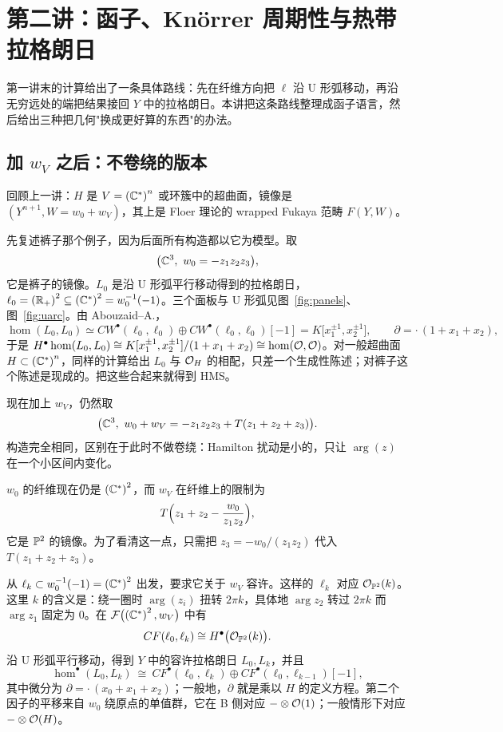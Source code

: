 \section{第二讲：函子、Knörrer 周期性与热带拉格朗日}

第一讲末的计算给出了一条具体路线：先在纤维方向把 $\ell$ 沿 U 形弧移动，再沿无穷远处的端把结果接回 $Y$ 中的拉格朗日。本讲把这条路线整理成函子语言，然后给出三种把几何"换成更好算的东西"的办法。

\subsection{\texorpdfstring{加 $w_V$ 之后：不卷绕的版本}{加 w\_V 之后：不卷绕的版本}}

回顾上一讲：$H$ 是 $V=\left(\mathbb{C}^*\right)^n$ 或环簇中的超曲面，镜像是 $(Y^{n+1},W=w_0+w_V)$，其上是 Floer 理论的 wrapped Fukaya 范畴 $F(Y,W)$。

先复述裤子那个例子，因为后面所有构造都以它为模型。取
\[
\bigl(\mathbb{C}^3,\ w_0=-z_1z_2z_3\bigr),
\]
它是裤子的镜像。$L_0$ 是沿 U 形弧平行移动得到的拉格朗日，$\ell_0=\left(\mathbb{R}_+\right)^2\subseteq\left(\mathbb{C}^*\right)^2=w_0^{-1}(-1)$。三个面板与 U 形弧见图~\ref{fig:panels}、图~\ref{fig:uarc}。由 Abouzaid--A.，
\[
\hom(L_0,L_0)\simeq CW^\bullet(\ell_0,\ell_0)\oplus CW^\bullet(\ell_0,\ell_0)[-1]
=K\bigl[x_1^{\pm1},x_2^{\pm1}\bigr],\qquad \partial=\cdot\,(1+x_1+x_2),
\]
于是 $H^\bullet\hom(L_0,L_0)\cong K[x_1^{\pm1},x_2^{\pm1}]/(1+x_1+x_2)\cong\hom(\mathcal{O},\mathcal{O})$。对一般超曲面 $H\subset\left(\mathbb{C}^*\right)^n$，同样的计算给出 $L_0$ 与 $\mathcal{O}_H$ 的相配，只差一个生成性陈述；对裤子这个陈述是现成的。把这些合起来就得到 HMS。

现在加上 $w_V$，仍然取
\[
\bigl(\C^3,\ w_0+w_V=-z_1z_2z_3+T(z_1+z_2+z_3)\bigr).
\]
构造完全相同，区别在于此时不做卷绕：Hamilton 扰动是小的，只让 $\arg(z)$ 在一个小区间内变化。

$w_0$ 的纤维现在仍是 $\left(\mathbb{C}^*\right)^2$，而 $w_V$ 在纤维上的限制为
\[
T\Bigl(z_1+z_2-\frac{w_0}{z_1z_2}\Bigr),
\]
它是 $\mathbb{P}^2$ 的镜像。为了看清这一点，只需把 $z_3=-w_0/(z_1z_2)$ 代入 $T(z_1+z_2+z_3)$。

从 $\ell_k\subset w_0^{-1}(-1)=\left(\mathbb{C}^*\right)^2$ 出发，要求它关于 $w_V$ 容许。这样的 $\ell_k$ 对应 $\mathcal{O}_{\mathbb{P}^2}(k)$。这里 $k$ 的含义是：绕一圈时 $\arg(z_i)$ 扭转 $2\pi k$，具体地 $\arg z_2$ 转过 $2\pi k$ 而 $\arg z_1$ 固定为 $0$。在 $\mathcal{F}\bigl(\left(\mathbb{C}^*\right)^2,w_V\bigr)$ 中有
\[
CF(\ell_0,\ell_k)\cong H^\bullet\bigl(\mathcal{O}_{\mathbb{P}^2}(k)\bigr).
\]
沿 U 形弧平行移动，得到 $Y$ 中的容许拉格朗日 $L_0,L_k$，并且
\begin{equation}
\hom^\bullet(L_0,L_k)\ \cong\ CF^\bullet(\ell_0,\ell_k)\oplus CF^\bullet(\ell_0,\ell_{k-1})[-1],
\label{eq:cone}
\end{equation}
其中微分为 $\partial=\cdot\,(x_0+x_1+x_2)$；一般地，$\partial$ 就是乘以 $H$ 的定义方程。第二个因子的平移来自 $w_0$ 绕原点的单值群，它在 B 侧对应 $-\otimes\mathcal{O}(1)$；一般情形下对应 $-\otimes\mathcal{O}(H)$。

